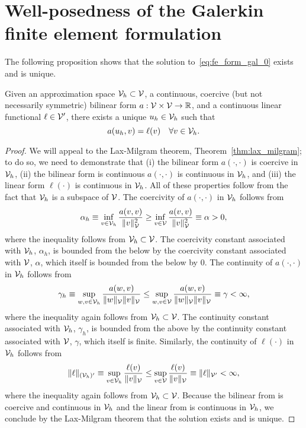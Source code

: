\section{Well-posedness of the Galerkin finite element formulation}
\label{sec:fe_form_gal_wellposed}
The following proposition shows that the solution to~\eqref{eq:fe_form_gal_0} exists and is unique.
\begin{proposition}
  \label{prop:fe_form_gal_wellposed}
    Given an approximation space $\mathcal{V}_h \subset \mathcal{V}$, a continuous, coercive (but not necessarily symmetric) bilinear form $a: \mathcal{V} \times \mathcal{V} \to \mathbb{R}$, and a continuous linear functional $\ell \in \mathcal{V}'$, there exists a unique $u_h \in \mathcal{V}_h$ such that
  \begin{equation*}
    a(u_h,v) = \ell(v) \quad \forall v \in \mathcal{V}_h.
  \end{equation*}
  \begin{proof}
We will appeal to the Lax-Milgram theorem, Theorem~\ref{thm:lax_milgram}; to do so, we need to demonstrate that (i) the bilinear form $a(\cdot,\cdot)$ is coercive in $\mathcal{V}_h$, (ii) the bilinear form is continuous $a(\cdot,\cdot)$ is continuous in $\mathcal{V}_h$, and (iii) the linear form $\ell(\cdot)$ is continuous in $\mathcal{V}_h$.  All of these properties follow from the fact that $\mathcal{V}_h$ is a subspace of $\mathcal{V}$.  The coercivity of $a(\cdot,\cdot)$ in $\mathcal{V}_h$ follows from
\begin{equation*}
  \alpha_h \equiv \inf_{v \in \mathcal{V}_h} \frac{a(v,v)}{\| v \|^2_{\mathcal{V}}} \geq
  \inf_{v \in \mathcal{V}} \frac{a(v,v)}{\| v \|^2_{\mathcal{V}}} \equiv \alpha > 0,
\end{equation*}
where the inequality follows from $\mathcal{V}_h \subset \mathcal{V}$.  The coercivity constant associated with $\mathcal{V}_h$, $\alpha_h$, is bounded from the below by the coercivity constant associated with $\mathcal{V}$, $\alpha$, which itself is bounded from the below by $0$. The continuity of $a(\cdot,\cdot)$ in $\mathcal{V}_h$ follows from
\begin{equation*}
  \gamma_h \equiv \sup_{w,v \in \mathcal{V}_h} \frac{a(w,v)}{\|w\|_{\mathcal{V}}\| v \|_{\mathcal{V}}} \leq
  \sup_{w,v \in \mathcal{V}} \frac{a(w,v)}{\| w \|_{\mathcal{V}}\| v \|_{\mathcal{V}}} \equiv \gamma < \infty,
\end{equation*}
where the inequality again follows from $\mathcal{V}_h \subset \mathcal{V}$.  The continuity constant associated with $\mathcal{V}_h$, $\gamma_h$, is bounded from the above by the continuity constant associated with $\mathcal{V}$, $\gamma$, which itself is finite.  Similarly, the continuity of $\ell(\cdot)$ in $\mathcal{V}_h$ follows from
\begin{equation*}
  \| \ell \|_{(\mathcal{V}_h)'} \equiv \sup_{v \in \mathcal{V}_h} \frac{\ell(v)}{\| v \|_{\mathcal{V}}} \leq \sup_{v \in \mathcal{V}} \frac{\ell(v)}{\| v \|_{\mathcal{V}}} \equiv \| \ell \|_{\mathcal{V}'} < \infty,
\end{equation*}
where the inequality again follows from $\mathcal{V}_h \subset \mathcal{V}$.  Because the bilinear from is coercive and continuous in $\mathcal{V}_h$ and the linear from is continuous in $\mathcal{V}_h$, we conclude by the Lax-Milgram theorem that the solution exists and is unique.
  \end{proof}
\end{proposition}
